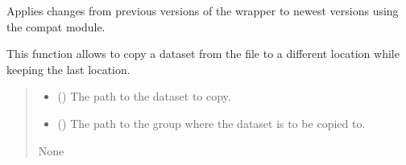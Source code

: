 \documentclass[letterpaper,10pt,english]{sphinxmanual}
\begin{document}
\begin{fulllineitems}
\begin{fulllineitems}
\label{\detokenize{_autosummary/HDF5_BLS.wrapper:HDF5_BLS.wrapper.Wrapper.compatibility_changes}}
\pysigstartsignatures
\pysiglinewithargsret
{}
{}
{}
\pysigstopsignatures
\sphinxAtStartPar
Applies changes from previous versions of the wrapper to newest versions using the compat module.

\end{fulllineitems}


\begin{fulllineitems}
\label{\detokenize{_autosummary/HDF5_BLS.wrapper:HDF5_BLS.wrapper.Wrapper.copy_dataset}}
\pysigstartsignatures
\pysiglinewithargsret
{}
{\sphinxparamcomma {}}
{}
\pysigstopsignatures
\sphinxAtStartPar
This function allows to copy a dataset from the file to a different location while keeping the last location.
\begin{quote}\begin{description}
\begin{itemize}
\item {} 
\sphinxAtStartPar
{} () \textendash{} The path to the dataset to copy.

\item {} 
\sphinxAtStartPar
{} () \textendash{} The path to the group where the dataset is to be copied to.

\end{itemize}

\sphinxAtStartPar
None

\end{description}\end{quote}

\end{fulllineitems}



\end{fulllineitems}
\end{document}
